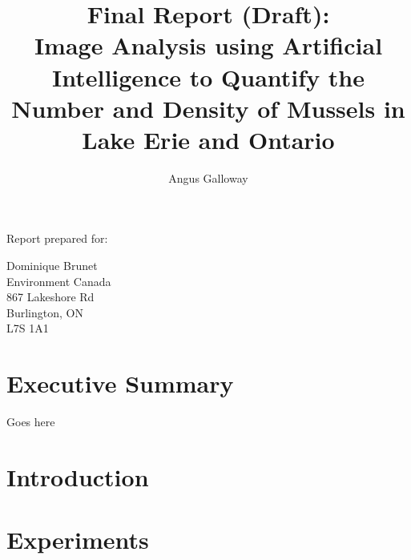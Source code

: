 \documentclass[11pt]{article} %
\title{Final Report (Draft): \\
Image Analysis using Artificial Intelligence to
Quantify the Number and Density of Mussels in Lake Erie and Ontario}
\author{Angus Galloway}
\begin{document}
\maketitle

\thispagestyle{empty}

\vspace{5cm}

\begin{centering}

Report prepared for:

\vspace{1cm}

Dominique Brunet \\ 
Environment Canada \\ 
867 Lakeshore Rd \\
Burlington, ON \\
L7S 1A1 

\end{centering}

\clearpage


\setcounter{page}{1}

\section*{Executive Summary}

Goes here

\clearpage

\tableofcontents

\clearpage

\setcounter{page}{1}

\section{Introduction}

\section{Experiments} 
\end{document}
